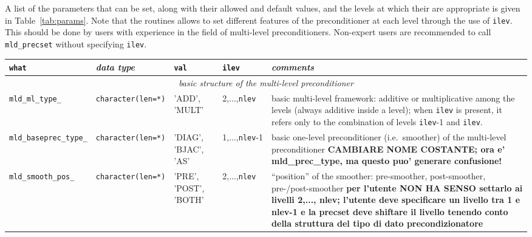 A list of the parameters that can be set, along with their allowed and default values, and the levels
at which their are appropriate is given in Table~\ref{tab:params}. Note that the routines allows
to set different features of the preconditioner at each level through the use of \verb|ilev|.
This should be done by users with experience in the field of multi-level preconditioners.
Non-expert users are recommended to call \verb| mld_precset| without specifying \verb|ilev|. 


\begin{sidewaystable}
\begin{center}
\begin{tabular}{|l|l|p{1.5cm}|l|p{6cm}|}
\hline
\verb|what|              & \emph{data type}        &  \verb|val|      &  \verb|ilev|  & \emph{comments} \\ \hline
\multicolumn{5}{|c|}{\emph{basic structure of the multi-level preconditioner}}                          \\ \hline
\verb|mld_ml_type_|      & \verb|character(len=*)|
                         & 'ADD', 'MULT'   
                         &  2,...,\verb|nlev|
                         & basic multi-level framework: additive or multiplicative among the levels
                          (always additive inside a level); when \verb|ilev| is present, it refers
                          only to the combination of levels \verb|ilev|-1 and  \verb|ilev|.    \\  
\verb|mld_baseprec_type_|& \verb|character(len=*)|
                         & 'DIAG', 'BJAC', 'AS'
                         & 1,...,\verb|nlev|-1
                         & basic one-level preconditioner (i.e.\ smoother) of the multi-level
                           preconditioner \textbf{CAMBIARE NOME COSTANTE; ora e' mld\_prec\_type,
                           ma questo puo' generare confusione!}                                 \\
\verb|mld_smooth_pos_|   & \verb|character(len=*)|
                         & 'PRE', 'POST', 'BOTH'
                         & 2,...,\verb|nlev|
                         & ``position'' of the smoother: pre-smoother, post-smoother, pre-/post-smoother
                           \textbf{per l'utente NON HA SENSO settarlo ai livelli 2,..., nlev; l'utente
                           deve specificare un livello tra 1 e nlev-1 e la precset deve shiftare il livello
                           tenendo conto della struttura del tipo di
                           dato precondizionatore}           \\ \hline
                       \end{tabular}
                     \end{center}                       
                   \end{sidewaystable}
                   
